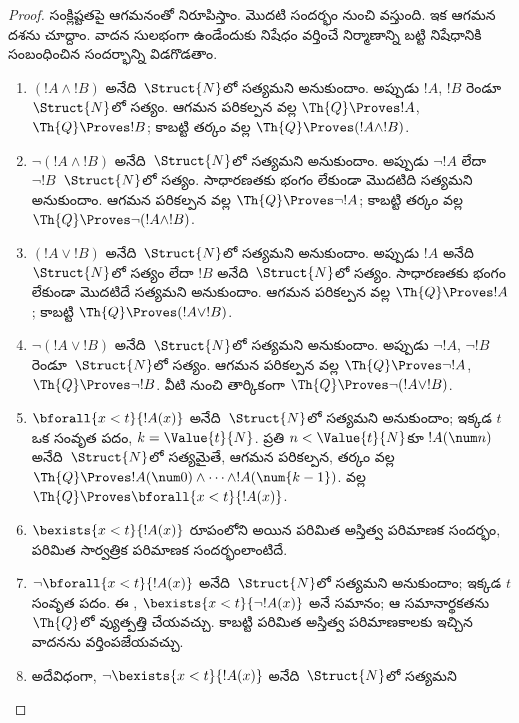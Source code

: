 \documentclass[../../../include/open-logic-section]{subfiles}
\begin{document}
\begin{proof}
 సంక్లిష్టతపై ఆగమనంతో నిరూపిస్తాం.
%
మొదటి సందర్భం  నుంచి వస్తుంది. ఇక ఆగమన
దశను చూద్దాం. వాదన సులభంగా ఉండేందుకు నిషేధం వర్తించే
 నిర్మాణాన్ని బట్టి నిషేధానికి సంబంధించిన సందర్భాన్ని విడగొడతాం.

\begin{enumerate}
\item $(!A\land !B)$ అనేది~$\Struct{N}$లో సత్యమని అనుకుందాం. అప్పుడు
$!A$, $!B$ రెండూ~$\Struct{N}$లో సత్యం. ఆగమన పరికల్పన వల్ల
$\Th{Q}\Proves !A$, $\Th{Q}\Proves !B$; కాబట్టి తర్కం వల్ల
$\Th{Q}\Proves(!A\land !B)$.
%
\item $\lnot(!A\land !B)$ అనేది~$\Struct{N}$లో సత్యమని అనుకుందాం. అప్పుడు
$\lnot !A$ లేదా $\lnot !B$~$\Struct{N}$లో సత్యం. సాధారణతకు భంగం లేకుండా
మొదటిది సత్యమని అనుకుందాం. ఆగమన పరికల్పన వల్ల
$\Th{Q}\Proves\lnot !A$; కాబట్టి తర్కం వల్ల
$\Th{Q}\Proves\lnot(!A\land !B)$.
%
\item $(!A\lor !B)$ అనేది~$\Struct{N}$లో సత్యమని అనుకుందాం. అప్పుడు
$!A$ అనేది~$\Struct{N}$లో సత్యం లేదా $!B$ అనేది~$\Struct{N}$లో సత్యం.
సాధారణతకు భంగం లేకుండా మొదటిదే
సత్యమని అనుకుందాం. ఆగమన పరికల్పన వల్ల $\Th{Q}\Proves !A$; కాబట్టి
$\Th{Q}\Proves(!A\lor !B)$.
%
\item $\lnot(!A\lor !B)$ అనేది~$\Struct{N}$లో సత్యమని అనుకుందాం. అప్పుడు
$\lnot !A$, $\lnot !B$ రెండూ~$\Struct{N}$లో సత్యం. ఆగమన పరికల్పన వల్ల
$\Th{Q}\Proves\lnot !A$, $\Th{Q}\Proves\lnot !B$. వీటి నుంచి తార్కికంగా
$\Th{Q}\Proves\lnot(!A\lor !B)$.
%
\item $\bforall{x<t}{!A(x)}$ అనేది~$\Struct{N}$లో సత్యమని అనుకుందాం; ఇక్కడ
$t$ ఒక సంవృత పదం, $k=\Value{t}{N}$. ప్రతి $n<\Value{t}{N}$కూ
$!A(\num n)$ అనేది~$\Struct{N}$లో సత్యమైతే, ఆగమన పరికల్పన, తర్కం వల్ల
$\Th{Q}\Proves !A(\num0)\land\dots\land !A(\num{k-1})$.
 వల్ల
$\Th{Q}\Proves\bforall{x<t}{!A(x)}$.
%
\item $\bexists{x<t}{!A(x)}$ రూపంలోని  అయిన పరిమిత అస్తిత్వ
పరిమాణక సందర్భం, పరిమిత సార్వత్రిక పరిమాణక సందర్భంలాంటిదే.
%
\item $\lnot\bforall{x<t}{!A(x)}$ అనేది~$\Struct{N}$లో సత్యమని అనుకుందాం;
ఇక్కడ $t$ సంవృత పదం. ఈ ,
$\bexists{x<t}{\lnot !A(x)}$ అనే  సమానం; ఆ సమానార్థకతను
$\Th{Q}$లో వ్యుత్పత్తి చేయవచ్చు. కాబట్టి పరిమిత అస్తిత్వ పరిమాణకాలకు ఇచ్చిన
వాదనను వర్తింపజేయవచ్చు.
%
\item అదేవిధంగా, $\lnot\bexists{x<t}{!A(x)}$ అనేది~$\Struct{N}$లో సత్యమని

\end{enumerate}
\end{proof}
\end{document}
